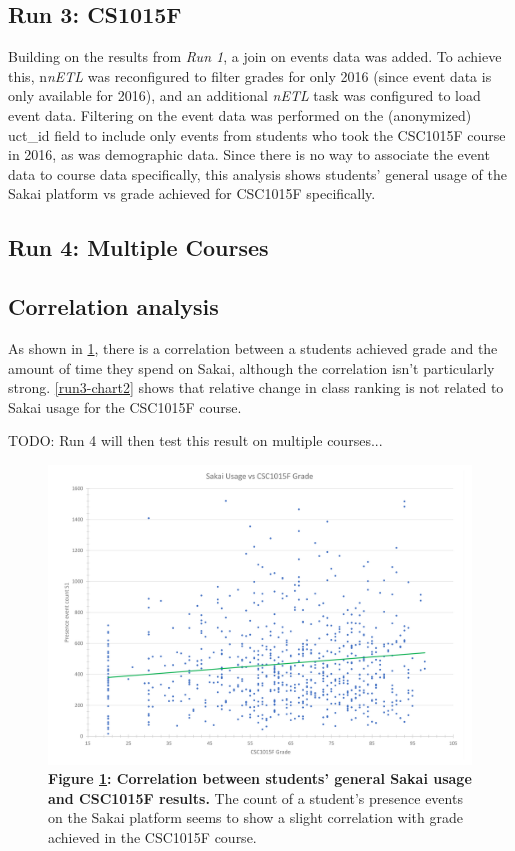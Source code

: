 \subsection{Run 3: CS1015F}
Building on the results from \textit{Run 1}, a join on events data was added. To achieve this, n\textit{nETL} was reconfigured to filter grades for only 2016 (since event data is only available for 2016), and an additional \textit{nETL} task was configured to load event data. Filtering on the event data was performed on the (anonymized) uct\_id field to include only events from students who took the CSC1015F course in 2016, as was demographic data. Since there is no way to associate the event data to course data specifically, this analysis shows students' general usage of the Sakai platform vs grade achieved for CSC1015F specifically.

\subsection{Run 4: Multiple Courses}

\subsection{Correlation analysis}
As shown in \ref{run3-chart1}, there is a correlation between a students achieved grade and the amount of time they spend on Sakai, although the correlation isn't particularly strong. \ref{run3-chart2} shows that relative change in class ranking is not related to Sakai usage for the CSC1015F course.

TODO: Run 4 will then test this result on multiple courses...


\begin{figure}[H]
    \centering
    \begin{mdframed}
        \centering
        \includegraphics[scale=0.55]{./resources/figures/run3-chart1.png}
    \end{mdframed}
    \caption[CSC1015 grade vs general Sakai usage]{\textbf{Figure \ref{run3-chart1}: Correlation between students' general Sakai usage and CSC1015F results.} The count of a student's presence events on the Sakai platform seems to show a slight correlation with grade achieved in the CSC1015F course.}
    \label{run3-chart1}
\end{figure}

